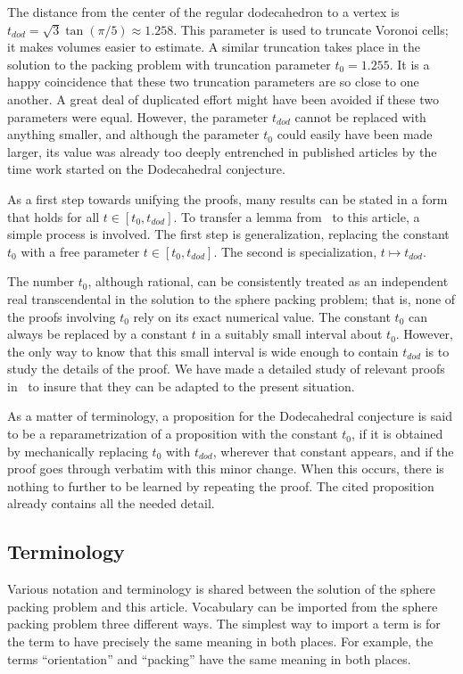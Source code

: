 \documentclass{article} %
\begin{document}
The distance from the center of the regular dodecahedron to a vertex
is $t_{dod}=\sqrt{3}\tan(\pi/5)\approx 1.258$. This parameter is used
to truncate Voronoi cells; it makes volumes easier to estimate. A
similar truncation takes place in the solution to the packing problem
with truncation parameter $t_0 = 1.255$. It is a happy coincidence
that these two truncation parameters are so close to one another. A
great deal of duplicated effort might have been avoided if these two
parameters were equal. However, the parameter $t_{dod}$ cannot be
replaced with anything smaller, and although the parameter $t_0$ could
easily have been made larger, its value was already too deeply
entrenched in published articles by the time work started on the
Dodecahedral conjecture.

 As a first step towards unifying the proofs, many results can be
stated in a form that holds for all $t\in[t_0,t_{dod}]$. To transfer a
lemma from~\cite{Hales:2006:DCG} to this article, a simple process is
involved. The first step is generalization, replacing the constant
$t_0$ with a free parameter $t\in[t_0,t_{dod}]$. The second is
specialization, $t\mapsto t_{dod}$.

The number $t_0$, although rational, can be consistently treated as an
independent real transcendental in the solution to the sphere packing
problem; that is, none of the proofs involving $t_0$ rely on its exact
numerical value. The constant $t_0$ can always be replaced by a
constant $t$ in a suitably small interval about $t_0$. However, the
only way to know that this small interval is wide enough to contain
$t_{dod}$ is to study the details of the proof. We have made a
detailed study of relevant proofs in~\cite{Hales:2006:DCG} to insure
that they can be adapted to the present situation.

As a matter of terminology, a proposition for the Dodecahedral
conjecture is said to be a reparametrization of a proposition
with the constant $t_0$, if it is obtained by mechanically replacing
$t_0$ with $t_{dod}$, wherever that constant appears, and if the proof
goes through verbatim with this minor change. When this occurs, there
is nothing to further to be learned by repeating the proof.
The cited proposition already contains all the needed detail.

\subsection{Terminology}

Various notation and terminology is shared between the solution of the
sphere packing problem and this article. Vocabulary can be imported
from the sphere packing problem three different ways. The simplest way
to import a term is for the term to have precisely the same meaning in
both places. For example, the terms ``orientation'' and ``packing''
have the same meaning in both places.
\end{document}

